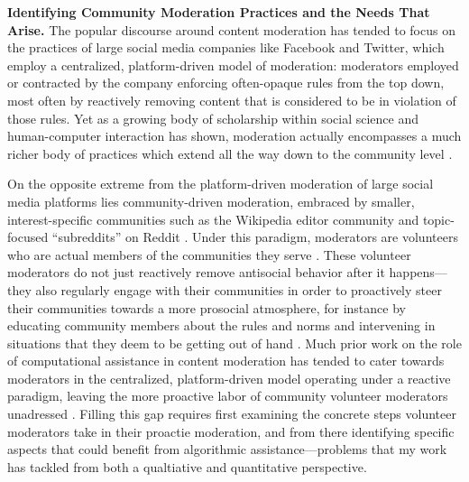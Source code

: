 \documentclass[11pt,letterpaper]{article}
\renewcommand{\section}[1]{\vspace{0.25\baselineskip}\noindent\textbf{#1.}}
\begin{document}
\section{Identifying Community Moderation Practices and the Needs That Arise}
The popular discourse around content moderation has tended to focus on the practices of large social media companies like Facebook and Twitter, which employ a centralized, platform-driven model of moderation: moderators employed or contracted by the company enforcing often-opaque rules from the top down, most often by reactively removing content that is considered to be in violation of those rules.
Yet as a growing body of scholarship within social science and human-computer interaction has shown, moderation actually encompasses a much richer body of practices which extend all the way down to the community level \cite{brewer_inclusion_2020,lampe_slashdot_2004,seering_reconsidering_2020}.

On the opposite extreme from the platform-driven moderation of large social media platforms lies community-driven moderation, embraced by smaller, interest-specific communities such as the Wikipedia editor community and topic-focused ``subreddits'' on Reddit \cite{chandrasekharan_internets_2018,halfaker_rise_2013}.
Under this paradigm, moderators are volunteers who are actual members of the communities they serve \cite{gilbert_i_2020,lo_when_2018}.
These volunteer moderators do not just reactively remove antisocial behavior after it happens---they also regularly engage with their communities in order to proactively steer their communities towards a more prosocial atmosphere, for instance by educating community members about the rules and norms and intervening in situations that they deem to be getting out of hand \cite{seering_shaping_2017,cai_what_2019,billings_understanding_2010}.
Much prior work on the role of computational assistance in content moderation has tended to cater towards moderators in the centralized, platform-driven model operating under a reactive paradigm, leaving the more proactive labor of community volunteer moderators unadressed \cite{jurgens_just_2019}.
Filling this gap requires first examining the concrete steps volunteer moderators take in their proactie moderation, and from there identifying specific aspects that could benefit from algorithmic assistance---problems that my work has tackled from both a qualtiative and quantitative perspective.
\end{document}
